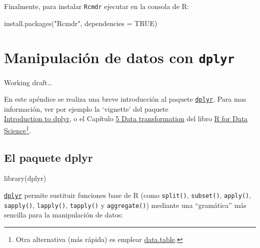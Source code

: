 \documentclass[
]{book}
\newenvironment{Shaded}{\begin{snugshade}}{\end{snugshade}}
\newcommand{\AttributeTok}[1]{\textcolor[rgb]{0.77,0.63,0.00}{#1}}
\newcommand{\ConstantTok}[1]{\textcolor[rgb]{0.00,0.00,0.00}{#1}}
\newcommand{\FunctionTok}[1]{\textcolor[rgb]{0.00,0.00,0.00}{#1}}
\newcommand{\NormalTok}[1]{#1}
\newcommand{\StringTok}[1]{\textcolor[rgb]{0.31,0.60,0.02}{#1}}
\theoremstyle{break}
\theoremstyle{nonumberplain}
\begin{document}
Finalmente, para instalar \texttt{Rcmdr} ejecutar en la consola de R:

\begin{Shaded}
\begin{Highlighting}[]
\FunctionTok{install.packages}\NormalTok{(}\StringTok{"Rcmdr"}\NormalTok{, }\AttributeTok{dependencies =} \ConstantTok{TRUE}\NormalTok{)}
\end{Highlighting}
\end{Shaded}

\hypertarget{dplyr}{%
\chapter{\texorpdfstring{Manipulación de datos con \texttt{dplyr}}{Manipulación de datos con dplyr}}\label{dplyr}}

Working draft\ldots{}

En este apéndice se realiza una breve introducción al paquete \href{https://dplyr.tidyverse.org/index.html}{\texttt{dplyr}}.
Para mas información, ver por ejemplo la `vignette' del paquete\\
\href{https://cran.rstudio.com/web/packages/dplyr/vignettes/dplyr.html}{Introduction to dplyr},
o el Capítulo \href{http://r4ds.had.co.nz/transform.html}{5 Data transformation} del libro
\href{http://r4ds.had.co.nz}{R for Data Science}\footnote{Otra alternativa (más rápida) es emplear
  \href{https://rdatatable.gitlab.io/data.table}{data.table}.}.

\hypertarget{dplyr-pkg}{%
\section{\texorpdfstring{El paquete \textbf{dplyr}}{El paquete dplyr}}\label{dplyr-pkg}}

\begin{Shaded}
\begin{Highlighting}[]
\FunctionTok{library}\NormalTok{(dplyr)}
\end{Highlighting}
\end{Shaded}

\href{https://dplyr.tidyverse.org/index.html}{\texttt{dplyr}}
permite sustituir funciones base de R (como \texttt{split()}, \texttt{subset()},
\texttt{apply()}, \texttt{sapply()}, \texttt{lapply()}, \texttt{tapply()} y \texttt{aggregate()})
mediante una ``gramática'' más sencilla para la manipulación de datos:
\end{document}
